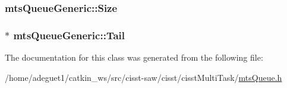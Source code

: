 \hypertarget{classmts_queue_generic_a5ac0990984482842ee9dcdf7e27e04ff}{
\subsubsection[{Size}]{ mts\-Queue\-Generic\-::\-Size\hspace{0.3cm}{\ttfamily [protected]}}}\label{classmts_queue_generic_a5ac0990984482842ee9dcdf7e27e04ff}
\hypertarget{classmts_queue_generic_a892964deb939b83138b69b9b852e1f7d}{
\subsubsection[{Tail}]{$\ast$ mts\-Queue\-Generic\-::\-Tail\hspace{0.3cm}{\ttfamily [protected]}}}\label{classmts_queue_generic_a892964deb939b83138b69b9b852e1f7d}


The documentation for this class was generated from the following file\-:\begin{DoxyCompactItemize}
\item 
/home/adeguet1/catkin\-\_\-ws/src/cisst-\/saw/cisst/cisst\-Multi\-Task/\hyperlink{mts_queue_8h}{mts\-Queue.\-h}\end{DoxyCompactItemize}
